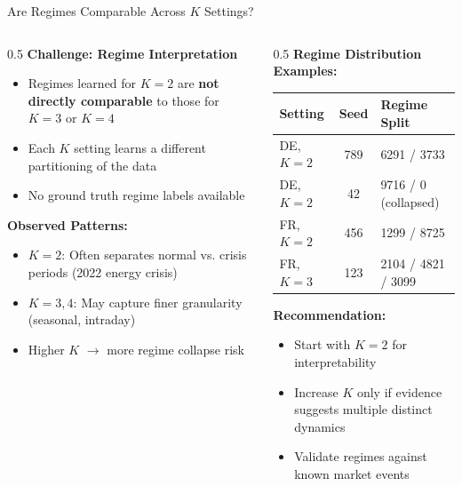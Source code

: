 \documentclass[aspectratio=169]{beamer}
\begin{document}
\begin{frame}{Are Regimes Comparable Across $K$ Settings?}
\begin{columns}
\begin{column}{0.5\textwidth}
\textbf{Challenge: Regime Interpretation}
\begin{itemize}
    \item Regimes learned for $K=2$ are \textbf{not directly comparable} to those for $K=3$ or $K=4$
    \item Each $K$ setting learns a different partitioning of the data
    \item No ground truth regime labels available
\end{itemize}

\vspace{0.3cm}
\textbf{Observed Patterns:}
\begin{itemize}
    \item \textbf{$K=2$}: Often separates normal vs. crisis periods (2022 energy crisis)
    \item \textbf{$K=3,4$}: May capture finer granularity (seasonal, intraday)
    \item Higher $K$ $\rightarrow$ more regime collapse risk
\end{itemize}
\end{column}

\begin{column}{0.5\textwidth}
\textbf{Regime Distribution Examples:}
\begin{table}
\scriptsize
\begin{tabular}{l|c|l}
\toprule
\textbf{Setting} & \textbf{Seed} & \textbf{Regime Split} \\
\midrule
DE, $K=2$ & 789 & 6291 / 3733 \\
DE, $K=2$ & 42 & 9716 / 0 (collapsed) \\
FR, $K=2$ & 456 & 1299 / 8725 \\
FR, $K=3$ & 123 & 2104 / 4821 / 3099 \\
\bottomrule
\end{tabular}
\end{table}

\vspace{0.2cm}
\textbf{Recommendation:}
\begin{itemize}
    \item Start with $K=2$ for interpretability
    \item Increase $K$ only if evidence suggests multiple distinct dynamics
    \item Validate regimes against known market events
\end{itemize}
\end{column}
\end{columns}
\end{frame}
\end{document}
